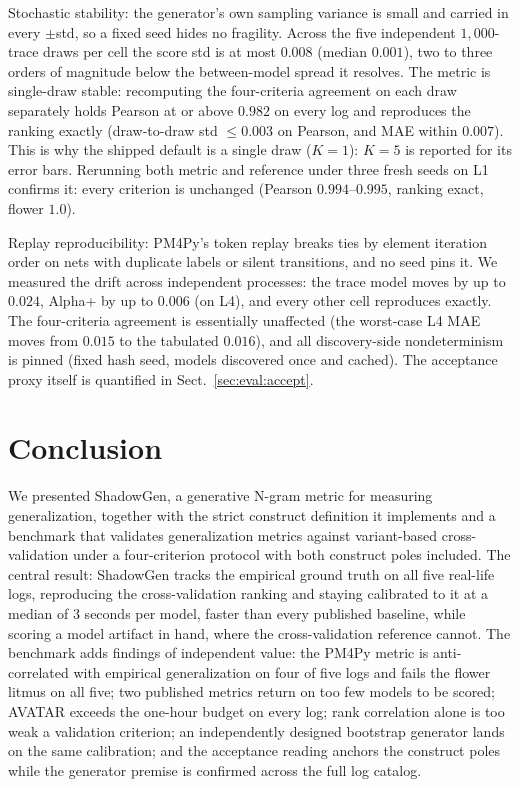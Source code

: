 \documentclass[runningheads]{llncs}
\begin{document}
Stochastic stability: the generator's own sampling variance is small and carried in every $\pm$std, so a fixed seed hides no fragility. Across the five independent $1{,}000$-trace draws per cell the score std is at most $0.008$ (median $0.001$), two to three orders of magnitude below the between-model spread it resolves. The metric is single-draw stable: recomputing the four-criteria agreement on each draw separately holds Pearson at or above $0.982$ on every log and reproduces the ranking exactly (draw-to-draw std $\le0.003$ on Pearson, and MAE within $0.007$). This is why the shipped default is a single draw ($K{=}1$): $K{=}5$ is reported for its error bars. Rerunning both metric and reference under three fresh seeds on L1 confirms it: every criterion is unchanged (Pearson $0.994$--$0.995$, ranking exact, flower $1.0$).

Replay reproducibility: PM4Py's token replay breaks ties by element iteration order on nets with duplicate labels or silent transitions, and no seed pins it. We measured the drift across independent processes: the trace model moves by up to $0.024$, Alpha+ by up to $0.006$ (on L4), and every other cell reproduces exactly. The four-criteria agreement is essentially unaffected (the worst-case L4 MAE moves from $0.015$ to the tabulated $0.016$), and all discovery-side nondeterminism is pinned (fixed hash seed, models discovered once and cached). The acceptance proxy itself is quantified in Sect.~\ref{sec:eval:accept}.

\section{Conclusion}
\label{sec:conclusion}

We presented ShadowGen, a generative N-gram metric for measuring generalization, together with the strict construct definition it implements and a benchmark that validates generalization metrics against variant-based cross-validation under a four-criterion protocol with both construct poles included. The central result: ShadowGen tracks the empirical ground truth on all five real-life logs, reproducing the cross-validation ranking and staying calibrated to it at a median of $3$ seconds per model, faster than every published baseline, while scoring a model artifact in hand, where the cross-validation reference cannot. The benchmark adds findings of independent value: the PM4Py metric is anti-correlated with empirical generalization on four of five logs and fails the flower litmus on all five; two published metrics return on too few models to be scored; AVATAR exceeds the one-hour budget on every log; rank correlation alone is too weak a validation criterion; an independently designed bootstrap generator lands on the same calibration; and the acceptance reading anchors the construct poles while the generator premise is confirmed across the full log catalog.
\end{document}
